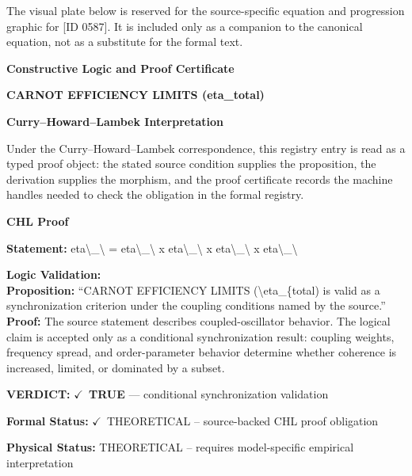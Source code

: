 \begingroup\footnotesize\sloppy
The visual plate below is reserved for the source-specific equation and progression graphic for [ID 0587]. It is included only as a companion to the canonical equation, not as a substitute for the formal text.
\par\endgroup
\ifTZPDarkEdition
{}
\fi

\clearpage
\begingroup\tzpsupportsetup
\noindent\textbf{\fontsize{10.8pt}{12.8pt}\selectfont [ID 0587] Constructive Logic and Proof Certificate}\par
\noindent\textbf{\fontsize{10pt}{12pt}\selectfont CARNOT EFFICIENCY LIMITS (eta\_total)}\par
\vspace{0.45em}
\begingroup
\footnotesize
\setlength{\parskip}{0.22em}
\setlength{\parindent}{0pt}
\noindent\textbf{Curry--Howard--Lambek Interpretation}\par
Under the Curry--Howard--Lambek correspondence, this registry entry is read as a typed proof
object: the stated source condition supplies the proposition, the derivation supplies the
morphism, and the proof certificate records the machine handles needed to check the obligation
in the formal registry.

\vspace{0.45em}
\noindent\textbf{CHL Proof}\par
\textbf{Statement:} eta\textbackslash{}\_\textbackslash{} = eta\textbackslash{}\_\textbackslash{} x eta\textbackslash{}\_\textbackslash{} x eta\textbackslash{}\_\textbackslash{} x eta\textbackslash{}\_\textbackslash{}

\textbf{Logic Validation:}\\
\textbf{Proposition:} ``CARNOT EFFICIENCY LIMITS (\textbackslash{}eta\_\{total) is valid as a synchronization criterion under
the coupling conditions named by the source.''\\
\textbf{Proof:} The source statement describes coupled-oscillator behavior. The logical claim is
accepted only as a conditional synchronization result: coupling weights, frequency
spread, and order-parameter behavior determine whether coherence is increased, limited,
or dominated by a subset.

\textbf{VERDICT:} \ensuremath{\checkmark}\ \textbf{TRUE} --- conditional synchronization validation

\textbf{Formal Status:} \ensuremath{\checkmark}\ THEORETICAL -- source-backed CHL proof obligation

\textbf{Physical Status:} THEORETICAL -- requires model-specific empirical interpretation
\par\vspace{0.45em}
\par
\ifTZPDarkEdition
{}
\fi
\endgroup
\endgroup
